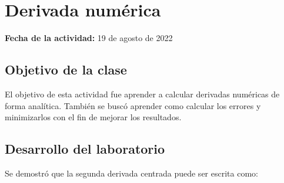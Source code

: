 \documentclass[../portafolio.tex]{subfiles}
\begin{document}


\section{Derivada numérica}   %

\hfill \textbf{Fecha de la actividad:} 19 de agosto de 2022

\medskip

\subsection{Objetivo de la clase}
El objetivo de esta actividad fue aprender a calcular derivadas numéricas de forma analítica. También se buscó aprender como calcular los errores y minimizarlos con el fin de mejorar los resultados.





\subsection{Desarrollo del laboratorio}

Se demostró que la segunda derivada centrada puede ser escrita como:
\end{document}
